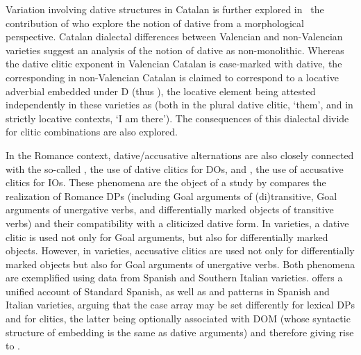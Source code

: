 \begin{styleListNumberi}
Variation involving dative structures in Catalan is further explored in \ the contribution of who explore the notion of dative from a morphological perspective. Catalan dialectal differences between Valencian and non-Valencian varieties suggest an analysis of the notion of dative as non-monolithic. Whereas the dative clitic exponent in Valencian Catalan is case-marked with dative, the corresponding in non-Valencian Catalan is claimed to correspond to a locative adverbial embedded under D (thus ), the locative element being attested independently in these varieties as (both in the plural dative clitic,  ‘them’, and in strictly locative contexts, ‘I am there’). The consequences of this dialectal divide for clitic combinations are also explored.
\end{styleListNumberi}

\begin{styleBodyA}
In the Romance context, dative/accusative alternations are also closely connected with the so-called , the use of dative clitics for DOs, and , the use of accusative clitics for IOs. These phenomena are the object of a study by compares the realization of Romance DPs (including Goal arguments of (di)transitive, Goal arguments of unergative verbs, and differentially marked objects of transitive verbs) and their compatibility with a cliticized dative form. In varieties, a dative clitic is used not only for Goal arguments, but also for differentially marked objects. However, in  varieties, accusative clitics are used not only for differentially marked objects but also for Goal arguments of unergative verbs. Both phenomena are exemplified using data from Spanish and Southern Italian varieties.  offers a unified account of Standard Spanish, as well as  and  patterns in Spanish and Italian varieties, arguing that the case array may be set differently for lexical DPs and for clitics, the latter being optionally associated with DOM (whose syntactic structure of embedding is the same as  dative arguments) and therefore giving rise to .
\end{styleBodyA}

